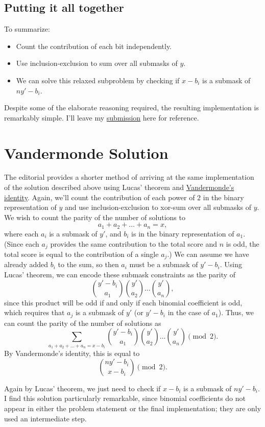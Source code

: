 \documentclass[11pt]{scrartcl}
\begin{document}
\subsection{Putting it all together}

To summarize:
\begin{itemize}
\item Count the contribution of each bit independently.
\item Use inclusion-exclusion to sum over all submasks of $y$.
\item We can solve this relaxed subproblem by checking if $x - b_i$ is a submask of $ny' - b_i$.
\end{itemize}

Despite some of the elaborate reasoning required, the resulting implementation is remarkably simple.
I'll leave my \href{https://codeforces.com/contest/1770/submission/188138802}{submission} here for reference.

\section{Vandermonde Solution}

The editorial provides a shorter method of arriving at the same implementation of the solution described above using Lucas' theorem and \href{https://en.wikipedia.org/wiki/Vandermonde's_identity}{Vandermonde's identity}.
Again, we'll count the contribution of each power of $2$ in the binary representation of $y$ and use inclusion-exclusion to xor-sum over all submasks of $y$.
We wish to count the parity of the number of solutions to
\[
a_1 + a_2 + \dots + a_n = x,
\]
where each $a_i$ is a submask of $y'$, and $b_i$ is in the binary representation of $a_1$.
(Since each $a_j$ provides the same contribution to the total score and $n$ is odd, the total score is equal to the contribution of a single $a_j$.)
We can assume we have already added $b_i$ to the sum, so then $a_i$ 
must be a submask of $y' - b_i$.
Using Lucas' theorem, we can encode these submask constraints as the parity of 
\[
  {y' - b_i \choose a_1} {y' \choose a_2} \dots {y' \choose a_n},
\]
since this product will be odd if and only if each binomial coefficient is odd, which requires that $a_j$ is a submask of $y'$ (or $y' - b_i$ in the case of $a_1$).
Thus, we can count the parity of the number of solutions as
\[
  \sum_{a_1 + a_2 + \dots + a_n = x - b_i} 
  {y' - b_i \choose a_1} {y' \choose a_2} \dots {y' \choose a_n}
  \pmod{2}.
\]
By Vandermonde's identity, this is equal to
\[
  {ny' - b_i \choose x - b_i} \pmod{2}.
\]

Again by Lucas' theorem, we just need to check if $x - b_i$ is a submask of $ny' - b_i$.
I find this solution particularly remarkable, since binomial coefficients do not appear in either the problem statement or the final implementation; they are only used an intermediate step.
\end{document}
